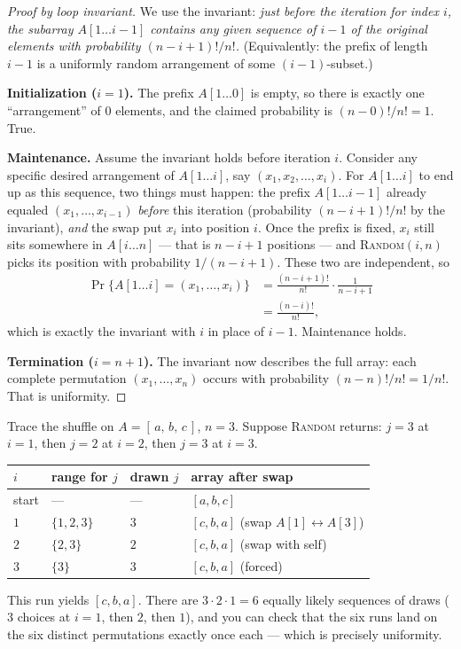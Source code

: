 \begin{proof}[Proof by loop invariant]
We use the invariant: \emph{just before the iteration for index $i$, the subarray
$A[1\dots i-1]$ contains any given sequence of $i-1$ of the original elements with
probability $(n-i+1)!/n!$.} (Equivalently: the prefix of length $i-1$ is a
uniformly random arrangement of some $(i-1)$-subset.)

\textbf{Initialization ($i=1$).} The prefix $A[1\dots 0]$ is empty, so there is
exactly one ``arrangement'' of $0$ elements, and the claimed probability is
$(n-0)!/n! = 1$. True.

\textbf{Maintenance.} Assume the invariant holds before iteration $i$. Consider
any specific desired arrangement of $A[1\dots i]$, say $(x_1, x_2, \dots, x_i)$.
For $A[1\dots i]$ to end up as this sequence, two things must happen: the prefix
$A[1\dots i-1]$ already equaled $(x_1, \dots, x_{i-1})$ \emph{before} this
iteration (probability $(n-i+1)!/n!$ by the invariant), \emph{and} the swap put
$x_i$ into position $i$. Once the prefix is fixed, $x_i$ still sits somewhere in
$A[i \dots n]$ --- that is $n-i+1$ positions --- and \textsc{Random}$(i,n)$ picks
its position with probability $1/(n-i+1)$. These two are independent, so
\begin{align*}
  \Pr\{A[1\dots i] = (x_1,\dots,x_i)\}
  &= \frac{(n-i+1)!}{n!}\cdot\frac{1}{n-i+1} \\
  &= \frac{(n-i)!}{n!},
\end{align*}
which is exactly the invariant with $i$ in place of $i-1$. Maintenance holds.

\textbf{Termination ($i = n+1$).} The invariant now describes the full array:
each complete permutation $(x_1, \dots, x_n)$ occurs with probability
$(n-n)!/n! = 1/n!$. That is uniformity.
\end{proof}

\begin{example}
\label{ch05:ex-shuffle-trace}
Trace the shuffle on $A = [\,a,\,b,\,c\,]$, $n=3$. Suppose \textsc{Random}
returns: $j=3$ at $i=1$, then $j=2$ at $i=2$, then $j=3$ at $i=3$.

\smallskip
\begin{tabular}{llll}
\toprule
$i$ & range for $j$ & drawn $j$ & array after swap \\
\midrule
start & --- & --- & $[a,b,c]$ \\
$1$ & $\{1,2,3\}$ & $3$ & $[c,b,a]$ \quad (swap $A[1]\leftrightarrow A[3]$) \\
$2$ & $\{2,3\}$ & $2$ & $[c,b,a]$ \quad (swap with self) \\
$3$ & $\{3\}$ & $3$ & $[c,b,a]$ \quad (forced) \\
\bottomrule
\end{tabular}

\smallskip
This run yields $[c,b,a]$. There are $3\cdot 2\cdot 1 = 6$ equally likely
sequences of draws ($3$ choices at $i=1$, then $2$, then $1$), and you can check
that the six runs land on the six distinct permutations exactly once each ---
which is precisely uniformity.
\end{example}

